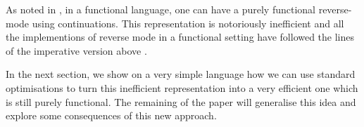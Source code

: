 As noted in \cite{pearlmutter2008reverse}, in a functional language, one can have a purely functional reverse-mode using continuations. 
This representation is notoriously inefficient and all the implementions of reverse mode in a functional setting have followed the lines of the imperative version above \cite{pearlmutter2008reverse, wang2018demystifying, baydin2016diffsharp}.

In the next section, we show on a very simple language how we can use standard optimisations to turn this inefficient representation into a very efficient one which is still purely functional.
The remaining of the paper will generalise this idea and explore some consequences of this new approach. 

